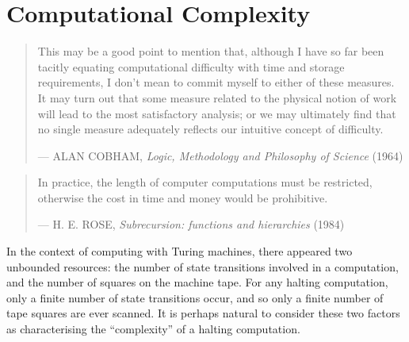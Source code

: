 \chapter{Computational Complexity} \label{sec:computational-complexity}

\begin{quotation}

\footnotesize\sffamily\itshape

\begin{flushright}

This may be a good point to mention that, although I have so far been tacitly
equating computational difficulty with time and storage requirements, I don't
mean to commit myself to either of these measures. It may turn out that some
measure related to the physical notion of work will lead to the most
satisfactory analysis; or we may ultimately find that no single measure
adequately reflects our intuitive concept of difficulty.

\smallbreak

\upshape

--- ALAN COBHAM, {\itshape Logic, Methodology and Philosophy of Science} (1964)

\end{flushright}

\end{quotation}

\begin{quotation}

\footnotesize\sffamily\itshape

\begin{flushright}

In practice, the length of computer computations must be restricted, otherwise
the cost in time and money would be prohibitive.

\smallbreak

\upshape

--- H. E. ROSE, {\itshape Subrecursion: functions and hierarchies} (1984)

\end{flushright}

\end{quotation}


In the context of computing with Turing machines, there appeared two unbounded
resources: the number of state transitions involved in a computation, and the
number of squares on the machine tape. For any halting computation, only a
finite number of state transitions occur, and so only a finite number of tape
squares are ever scanned. It is perhaps natural to consider these two factors
as characterising the ``complexity'' of a halting computation.

